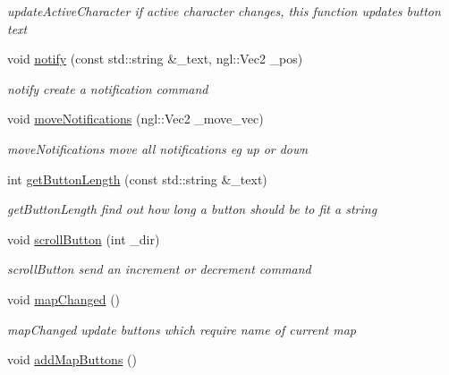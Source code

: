 \begin{DoxyCompactItemize}
\begin{DoxyCompactList}\small\item\em update\+Active\+Character if active character changes, this function updates button text \end{DoxyCompactList}\item 
void \hyperlink{class_gui_a2c1f54d7583accb97d684fc022d0e63e}{notify} (const std\+::string \&\+\_\+text, ngl\+::\+Vec2 \+\_\+pos)
\begin{DoxyCompactList}\small\item\em notify create a notification command \end{DoxyCompactList}\item 
void \hyperlink{class_gui_a5b9e1f5e066356ed773a15df52e1d94d}{move\+Notifications} (ngl\+::\+Vec2 \+\_\+move\+\_\+vec)
\begin{DoxyCompactList}\small\item\em move\+Notifications move all notifications eg up or down \end{DoxyCompactList}\item 
int \hyperlink{class_gui_aac291c98bb1a3a3191f1fc273f2b6320}{get\+Button\+Length} (const std\+::string \&\+\_\+text)
\begin{DoxyCompactList}\small\item\em get\+Button\+Length find out how long a button should be to fit a string \end{DoxyCompactList}\item 
void \hyperlink{class_gui_a9279b4ccbb94ceb79e878345c25e567f}{scroll\+Button} (int \+\_\+dir)
\begin{DoxyCompactList}\small\item\em scroll\+Button send an increment or decrement command \end{DoxyCompactList}\item 
\hypertarget{class_gui_adcb9a0227d1bef379a2fe39e98dea619}{}void \hyperlink{class_gui_adcb9a0227d1bef379a2fe39e98dea619}{map\+Changed} ()\label{class_gui_adcb9a0227d1bef379a2fe39e98dea619}

\begin{DoxyCompactList}\small\item\em map\+Changed update buttons which require name of current map \end{DoxyCompactList}\item 
\hypertarget{class_gui_af662508cdbbc88b11c4e07a7efc65642}{}void \hyperlink{class_gui_af662508cdbbc88b11c4e07a7efc65642}{add\+Map\+Buttons} ()\label{class_gui_af662508cdbbc88b11c4e07a7efc65642}


\end{DoxyCompactItemize}
